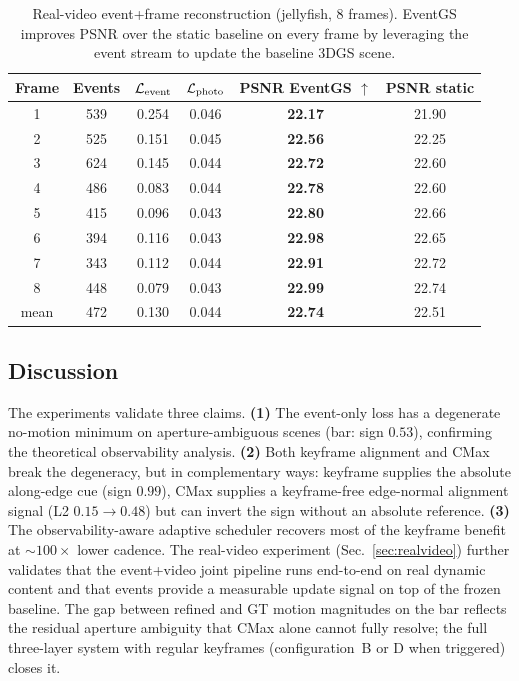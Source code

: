 \begin{table}[t]
\centering
\small
\caption{Real-video event+frame reconstruction (jellyfish, 8 frames). EventGS improves PSNR over the static baseline on every frame by leveraging the event stream to update the baseline 3DGS scene.}
\label{tab:realvideo}
\begin{tabular}{cccccc}
\toprule
Frame & Events & $\mathcal{L}_{\text{event}}$ & $\mathcal{L}_{\text{photo}}$ & PSNR EventGS $\uparrow$ & PSNR static \\
\midrule
1 & 539 & 0.254 & 0.046 & \textbf{22.17} & 21.90 \\
2 & 525 & 0.151 & 0.045 & \textbf{22.56} & 22.25 \\
3 & 624 & 0.145 & 0.044 & \textbf{22.72} & 22.60 \\
4 & 486 & 0.083 & 0.044 & \textbf{22.78} & 22.60 \\
5 & 415 & 0.096 & 0.043 & \textbf{22.80} & 22.66 \\
6 & 394 & 0.116 & 0.043 & \textbf{22.98} & 22.65 \\
7 & 343 & 0.112 & 0.044 & \textbf{22.91} & 22.72 \\
8 & 448 & 0.079 & 0.043 & \textbf{22.99} & 22.74 \\
\midrule
mean & 472 & 0.130 & 0.044 & \textbf{22.74} & 22.51 \\
\bottomrule
\end{tabular}
\end{table}

\subsection{Discussion}
The experiments validate three claims. \textbf{(1)} The event-only loss has a degenerate no-motion minimum on aperture-ambiguous scenes (bar: sign $0.53$), confirming the theoretical observability analysis. \textbf{(2)} Both keyframe alignment and CMax break the degeneracy, but in complementary ways: keyframe supplies the absolute along-edge cue (sign $0.99$), CMax supplies a keyframe-free edge-normal alignment signal (L2 $0.15\to0.48$) but can invert the sign without an absolute reference. \textbf{(3)} The observability-aware adaptive scheduler recovers most of the keyframe benefit at $\sim$$100\times$ lower cadence. The real-video experiment (Sec.~\ref{sec:realvideo}) further validates that the event+video joint pipeline runs end-to-end on real dynamic content and that events provide a measurable update signal on top of the frozen baseline. The gap between refined and GT motion magnitudes on the bar reflects the residual aperture ambiguity that CMax alone cannot fully resolve; the full three-layer system with regular keyframes (configuration~B or D when triggered) closes it.

